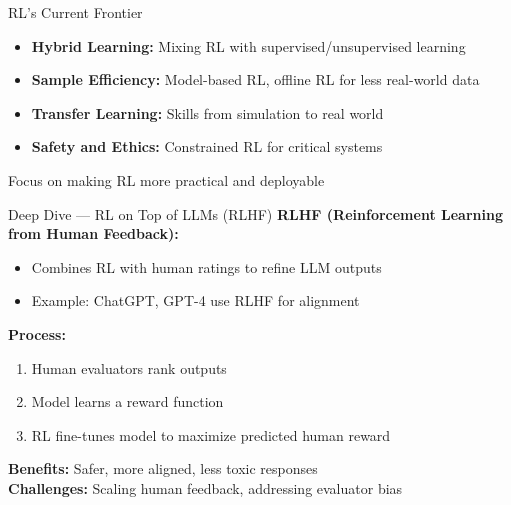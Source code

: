 \documentclass[aspectratio=169]{beamer}
\begin{document}
\begin{frame}{RL's Current Frontier}
  \begin{itemize}
    \item \textbf{Hybrid Learning:} Mixing RL with
      supervised/unsupervised learning
    \item \textbf{Sample Efficiency:} Model-based RL, offline RL for
      less real-world data
    \item \textbf{Transfer Learning:} Skills from simulation to real world
    \item \textbf{Safety and Ethics:} Constrained RL for critical systems
  \end{itemize}

  \vspace{0.5cm}
  \centering
  Focus on making RL more practical and deployable
\end{frame}

\begin{frame}{Deep Dive — RL on Top of LLMs (RLHF)}
  \textbf{RLHF (Reinforcement Learning from Human Feedback):}
  \begin{itemize}
    \item Combines RL with human ratings to refine LLM outputs
    \item Example: ChatGPT, GPT-4 use RLHF for alignment
  \end{itemize}

  \vspace{0.3cm}
  \textbf{Process:}
  \begin{enumerate}
    \item Human evaluators rank outputs
    \item Model learns a reward function
    \item RL fine-tunes model to maximize predicted human reward
  \end{enumerate}

  \vspace{0.3cm}
  \textbf{Benefits:} Safer, more aligned, less toxic responses\\
  \textbf{Challenges:} Scaling human feedback, addressing evaluator bias
\end{frame}
\end{document}
